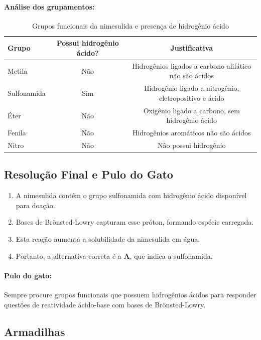 \documentclass{article}
\begin{document}
\paragraph{Análise dos grupamentos:}
\begin{table}[h!]
\centering
\begin{tabular}{|l|c|c|}
\hline
Grupo & Possui hidrogênio ácido? & Justificativa \\
\hline
Metila & Não & Hidrogênios ligados a carbono alifático não são ácidos \\
Sulfonamida & Sim & Hidrogênio ligado a nitrogênio, eletropositivo e ácido \\
Éter & Não & Oxigênio ligado a carbono, sem hidrogênio ácido \\
Fenila & Não & Hidrogênios aromáticos não são ácidos \\
Nitro & Não & Não possui hidrogênio \\
\hline
\end{tabular}
\caption{Grupos funcionais da nimesulida e presença de hidrogênio ácido}
\end{table}

\subsection*{Resolução Final e Pulo do Gato}

\begin{enumerate}
  \item A nimesulida contém o grupo sulfonamida com hidrogênio ácido disponível para doação.
  \item Bases de Brönsted-Lowry capturam esse próton, formando espécie carregada.
  \item Esta reação aumenta a solubilidade da nimesulida em água.
  \item Portanto, a alternativa correta é a \textbf{A}, que indica a sulfonamida.
\end{enumerate}

\paragraph{Pulo do gato:}
Sempre procure grupos funcionais que possuem hidrogênios ácidos para responder questões de reatividade ácido-base com bases de Brönsted-Lowry.

\subsection*{Armadilhas}
\end{document}
